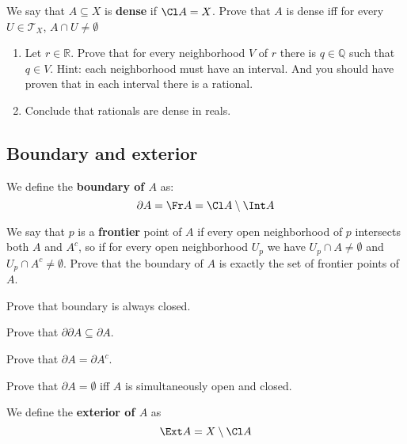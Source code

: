 \begin{prob}
  We say that $A\subseteq X$ is \textbf{dense} if $\Cl A=X$. Prove
  that $A$ is dense iff for every $U\in \mathcal T_X$, $A\cap U\neq \emptyset$
\end{prob}

\begin{prob}
  \begin{enumerate}
    \item Let $r\in \mathbb R$. Prove that for every neighborhood $V$ of $r$ there is $q\in \mathbb Q$ such that $q\in V$.
      Hint: each neighborhood must have an interval. And you should have proven that in each interval there is a rational.
    \item Conclude that rationals are dense in reals.
  \end{enumerate}
\end{prob}

\subsection{Boundary and exterior}

\noindent We define the \textbf{boundary of $A$} as:
$$\partial A=\Fr A = \Cl A \setminus \Int A$$

\begin{prob}
  We say that $p$ is a \textbf{frontier} point of $A$ if every open
  neighborhood of $p$ intersects both $A$ and $A^c$, so if
  for every open neighborhood $U_p$ we have
  $U_p\cap A\neq \emptyset$ and $U_p\cap A^c\neq \emptyset$.
  Prove that the boundary of $A$ is exactly the set of frontier
  points of $A$.
\end{prob}

\begin{prob}
  Prove that boundary is always closed.
\end{prob}

\begin{prob}
  Prove that $\partial \partial A \subseteq \partial A$.
\end{prob}

\begin{prob}
  Prove that $\partial A = \partial A^c.$
\end{prob}

\begin{prob}
  Prove that $\partial A = \emptyset$ iff $A$ is simultaneously
  open and closed.
\end{prob}

We define the \textbf{exterior of $A$} as
$$\Ext A = X\setminus \Cl A$$

